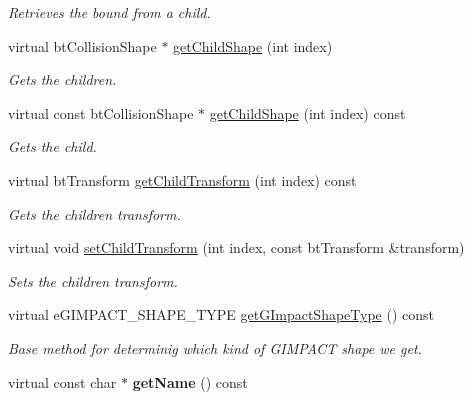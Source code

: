 \begin{DoxyCompactItemize}
\begin{DoxyCompactList}\small\item\em Retrieves the bound from a child. \end{DoxyCompactList}\item 
\hypertarget{classbt_g_impact_mesh_shape_ae268fb9f2813b1fa4171d87e201c37a7}{virtual bt\+Collision\+Shape $\ast$ \hyperlink{classbt_g_impact_mesh_shape_ae268fb9f2813b1fa4171d87e201c37a7}{get\+Child\+Shape} (int index)}\label{classbt_g_impact_mesh_shape_ae268fb9f2813b1fa4171d87e201c37a7}

\begin{DoxyCompactList}\small\item\em Gets the children. \end{DoxyCompactList}\item 
\hypertarget{classbt_g_impact_mesh_shape_a476d81e3da36410bb96da37599dfdbb0}{virtual const bt\+Collision\+Shape $\ast$ \hyperlink{classbt_g_impact_mesh_shape_a476d81e3da36410bb96da37599dfdbb0}{get\+Child\+Shape} (int index) const }\label{classbt_g_impact_mesh_shape_a476d81e3da36410bb96da37599dfdbb0}

\begin{DoxyCompactList}\small\item\em Gets the child. \end{DoxyCompactList}\item 
\hypertarget{classbt_g_impact_mesh_shape_a40f77ee9ac94d20af03c068a76b231ec}{virtual bt\+Transform \hyperlink{classbt_g_impact_mesh_shape_a40f77ee9ac94d20af03c068a76b231ec}{get\+Child\+Transform} (int index) const }\label{classbt_g_impact_mesh_shape_a40f77ee9ac94d20af03c068a76b231ec}

\begin{DoxyCompactList}\small\item\em Gets the children transform. \end{DoxyCompactList}\item 
virtual void \hyperlink{classbt_g_impact_mesh_shape_a274feed3c9a38a6af5c9f1141ae9ac1a}{set\+Child\+Transform} (int index, const bt\+Transform \&transform)
\begin{DoxyCompactList}\small\item\em Sets the children transform. \end{DoxyCompactList}\item 
virtual e\+G\+I\+M\+P\+A\+C\+T\+\_\+\+S\+H\+A\+P\+E\+\_\+\+T\+Y\+P\+E \hyperlink{classbt_g_impact_mesh_shape_acd958461b4f7802e5bceed2db87c4ff0}{get\+G\+Impact\+Shape\+Type} () const 
\begin{DoxyCompactList}\small\item\em Base method for determinig which kind of G\+I\+M\+P\+A\+C\+T shape we get. \end{DoxyCompactList}\item 
\hypertarget{classbt_g_impact_mesh_shape_a5cd08712fc8d24338b1d1ad14f4b72af}{virtual const char $\ast$ {\bfseries get\+Name} () const }\label{classbt_g_impact_mesh_shape_a5cd08712fc8d24338b1d1ad14f4b72af}


\end{DoxyCompactItemize}

